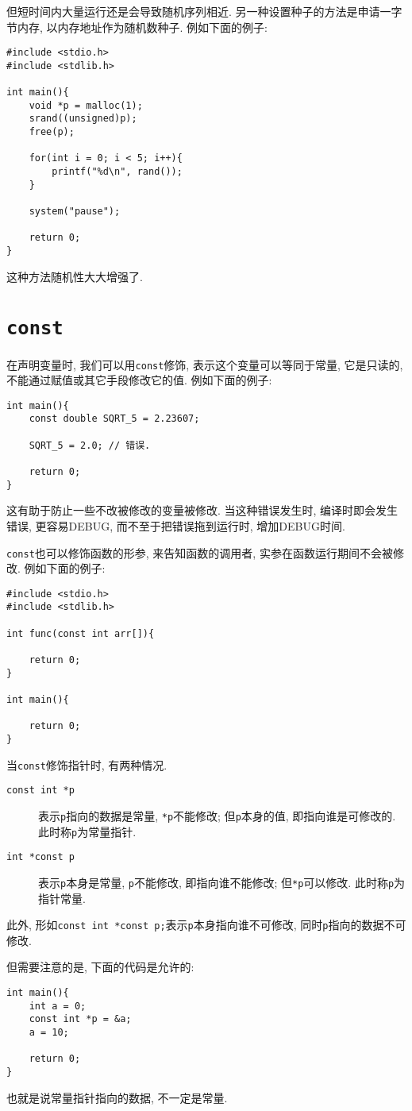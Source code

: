         但短时间内大量运行还是会导致随机序列相近. 另一种设置种子的方法是申请一字节内存, 以内存地址作为随机数种子. 例如下面的例子:
\begin{lstlisting}
#include <stdio.h>
#include <stdlib.h>

int main(){
    void *p = malloc(1);
    srand((unsigned)p);
    free(p);

    for(int i = 0; i < 5; i++){
        printf("%d\n", rand());
    }

    system("pause");

    return 0;
}
\end{lstlisting}

        这种方法随机性大大增强了.

    \section{\texttt{const}} 
        在声明变量时, 我们可以用\texttt{const}修饰, 表示这个变量可以等同于常量, 它是只读的, 不能通过赋值或其它手段修改它的值. 例如下面的例子:
\begin{lstlisting}
int main(){
    const double SQRT_5 = 2.23607;

    SQRT_5 = 2.0; // 错误.

    return 0;
}
\end{lstlisting}

        这有助于防止一些不改被修改的变量被修改. 当这种错误发生时, 编译时即会发生错误, 更容易DEBUG, 而不至于把错误拖到运行时, 增加DEBUG时间.

        \texttt{const}也可以修饰函数的形参, 来告知函数的调用者, 实参在函数运行期间不会被修改. 例如下面的例子:
\begin{lstlisting}
#include <stdio.h>
#include <stdlib.h>

int func(const int arr[]){

    return 0;
}

int main(){

    return 0;
}
\end{lstlisting}

        当\texttt{const}修饰指针时, 有两种情况.

        \begin{description}
            \item[\texttt{const int *p}] 表示\texttt{p}指向的数据是常量, \texttt{*p}不能修改; 但\texttt{p}本身的值, 即指向谁是可修改的. 此时称\texttt{p}为常量指针.
            \item[\texttt{int *const p}] 表示\texttt{p}本身是常量, \texttt{p}不能修改, 即指向谁不能修改; 但\texttt{*p}可以修改. 此时称\texttt{p}为指针常量.
        \end{description}

        此外, 形如\texttt{const int *const p;}表示\texttt{p}本身指向谁不可修改, 同时\texttt{p}指向的数据不可修改.

        但需要注意的是, 下面的代码是允许的:
\begin{lstlisting}
int main(){
    int a = 0;
    const int *p = &a;
    a = 10;

    return 0;
}
\end{lstlisting}

        也就是说常量指针指向的数据, 不一定是常量.